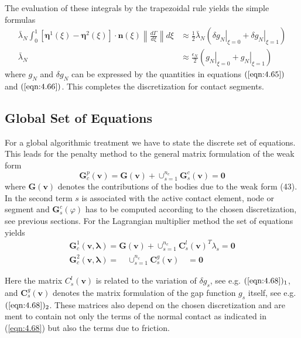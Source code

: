  The evaluation of these integrals by the trapezoidal rule yields the simple formulas
\begin{equation}
\begin{aligned}
\bar{\lambda}_{N} \int_{0}^{1}\left[\boldsymbol{\eta}^{1}(\xi)-\boldsymbol{\eta}^{2}(\xi)\right] \cdot \mathbf{n}(\xi)\left\|\frac{d \Gamma}{d \xi}\right\| d \xi & \approx \frac{1}{2} \bar{\lambda}_{N}\left(\left.\delta g_{N}\right|_{\xi=0}+\left.\delta g_{N}\right|_{\xi=1}\right) \\
\bar{\lambda}_{N} & \approx \frac{\epsilon_{N}}{2}\left(\left.g_{N}\right|_{\xi=0}+\left.g_{N}\right|_{\xi=1}\right)
\end{aligned}
\label{eqn:4.69}
\end{equation}
where $ g_{N} $ and $ \delta g_{N} $ can be expressed by the quantities in equations $ (\ref{eqn:4.65}) $ and $ (\ref{eqn:4.66}) $. This completes the discretization for contact segments. 


\subsection{ Global Set of Equations}
For a global algorithmic treatment we have to state the discrete set of equations. This leads for the penalty method to the general matrix formulation of the weak form
\begin{equation}
\mathbf{G}_{c}^{p}(\mathbf{v})=\mathbf{G}(\mathbf{v})+\cup_{s=1}^{n_{c}} \mathbf{G}_{s}^{c}(\mathbf{v})=\mathbf{0}
\label{eqn:4.70}
\end{equation}
where $ \mathbf{G}(\mathbf{v}) $ denotes the contributions of the bodies due to the weak form (43). In the second term $ s $ is associated with the active contact element, node or segment and $ \mathbf{G}_{s}^{c}(\varphi) $ has to be computed according to the chosen discretization, see previous sections. For the Lagrangian multiplier method the set of equations yields
\begin{equation}
\begin{array}{l}
\mathbf{G}_{c}^{1}(\mathbf{v}, \boldsymbol{\lambda})=\mathbf{G}(\mathbf{v})+\cup_{s=1}^{n_{c}} \mathbf{C}_{s}^{l}(\mathbf{v})^{T} \lambda_{s}=\mathbf{0} \\
\mathbf{G}_{c}^{2}(\mathbf{v}, \boldsymbol{\lambda})=\quad \cup_{s=1}^{n_{c}} \mathbf{C}_{s}^{g}(\mathbf{v}) \quad=\mathbf{0}
\end{array}
\label{eqn:4.71}
\end{equation}

Here the matrix $ C_{s}^{l}(\mathbf{v}) $ is related to the variation of $ \delta g_{s} $, see e.g. $ (\ref{eqn:4.68})_{1} $, and $ \mathbf{C}_{s}^{g}(\mathbf{v}) $ denotes the matrix formulation of the gap function $ g_{s} $ itself, see e.g. $ (\ref{eqn:4.68})_{2} $. These matrices also depend on the chosen discretization and are ment to contain not only the terms of the normal contact as indicated in (\ref{eqn:4.68}) but also the terms due to friction.

